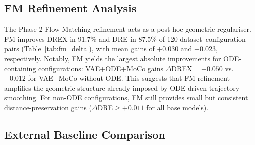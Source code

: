 \documentclass[journal]{IEEEtran}
\begin{document}
\begin{table}[!t]
    \centering
    \caption{Component contributions summary.}
    \label{tab:component_summary}
\end{table}

\subsection{FM Refinement Analysis}
\label{sec:discussion:fm}

The Phase-2 Flow Matching refinement acts as a post-hoc geometric regulariser. FM improves DREX in 91.7\% and DRE in 87.5\% of 120 dataset--configuration pairs (Table~\ref{tab:fm_delta}), with mean gains of $+0.030$ and $+0.023$, respectively. Notably, FM yields the largest absolute improvements for ODE-containing configurations: VAE+ODE+MoCo gains $\Delta$DREX$=+0.050$ vs.\ $+0.012$ for VAE+MoCo without ODE. This suggests that FM refinement amplifies the geometric structure already imposed by ODE-driven trajectory smoothing. For non-ODE configurations, FM still provides small but consistent distance-preservation gains ($\Delta$DRE$\geq+0.011$ for all base models).

\subsection{External Baseline Comparison}
\label{sec:discussion:baselines}
\end{document}
